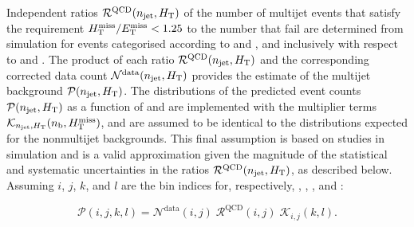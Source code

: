Independent ratios $\mathcal{R}^\text{QCD}(n_{\text{jet}}, H_{\mathrm{T}})$ of the
number of multijet events that satisfy the requirement $H_{\mathrm{T}}^{\text{miss}} / E_{\mathrm{T}}^{\text{miss}} <
1.25$ to the number that fail are determined from simulation for
events categorised according to \njet and \scalht, and inclusively
with respect to \nb and \HTmiss. The product of each ratio
$\mathcal{R}^\text{QCD}(n_{\text{jet}}, H_{\mathrm{T}})$ and the corresponding
corrected data count $\mathcal{N}^\text{data}(n_{\text{jet}}, H_{\mathrm{T}})$
provides the estimate of the multijet background $\mathcal{P}(n_{\text{jet}},
H_{\mathrm{T}})$. The distributions of the predicted event counts
$\mathcal{P}(n_{\text{jet}}, H_{\mathrm{T}})$ as a function of \nb and \HTmiss are
implemented with the multiplier terms $\mathcal{K}_{n_{\text{jet}},
  H_{\mathrm{T}}}(n_{\text{b}}, H_{\text{T}}^{\text{miss}})$, and are assumed to be identical to the
distributions expected for the nonmultijet backgrounds. This final
assumption is based on studies in simulation and is a valid
approximation given the magnitude of the statistical and systematic
uncertainties in the ratios $\mathcal{R}^\text{QCD}(n_{\text{jet}}, H_{\mathrm{T}})$,
as described below.
Assuming $i$, $j$, $k$, and $l$ are the bin indices for, respectively,
\njet, \scalht, \nb, and \HTmiss:

\begin{equation}
  \label{eq:qcd}
  \mathcal{P}( i, j, k, l ) =
  \mathcal{N}^\text{data}( i, j )\;
  \mathcal{R}^\text{QCD}( i, j )\;
  \mathcal{K}_{i,j}( k, l ).
\end{equation}

